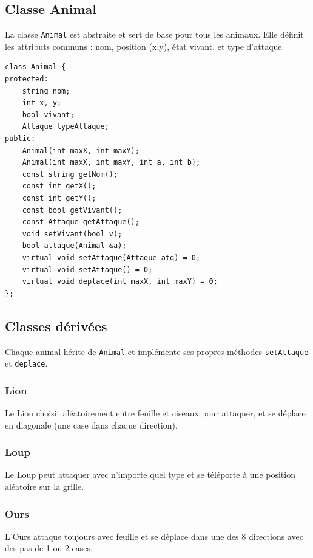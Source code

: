 \documentclass[a4paper,12pt,french]{article}
\begin{document}
\subsection{Classe Animal}

La classe \texttt{Animal} est abstraite et sert de base pour tous les animaux. Elle définit les attributs communs : nom, position (x,y), état vivant, et type d'attaque.

\begin{verbatim}
class Animal {
protected:
    string nom;
    int x, y;
    bool vivant;
    Attaque typeAttaque;
public:
    Animal(int maxX, int maxY);
    Animal(int maxX, int maxY, int a, int b);
    const string getNom();
    const int getX();
    const int getY();
    const bool getVivant();
    const Attaque getAttaque();
    void setVivant(bool v);
    bool attaque(Animal &a);
    virtual void setAttaque(Attaque atq) = 0;
    virtual void setAttaque() = 0;
    virtual void deplace(int maxX, int maxY) = 0;
};
\end{verbatim}

\subsection{Classes dérivées}

Chaque animal hérite de \texttt{Animal} et implémente ses propres méthodes \texttt{setAttaque} et \texttt{deplace}.

\subsubsection{Lion}

Le Lion choisit aléatoirement entre feuille et ciseaux pour attaquer, et se déplace en diagonale (une case dans chaque direction).

\subsubsection{Loup}

Le Loup peut attaquer avec n'importe quel type et se téléporte à une position aléatoire sur la grille.

\subsubsection{Ours}

L'Ours attaque toujours avec feuille et se déplace dans une des 8 directions avec des pas de 1 ou 2 cases.
\end{document}
